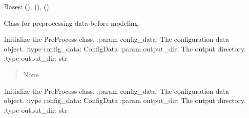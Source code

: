 \documentclass[a4paper,11pt,english,openany]{sphinxmanual}
\begin{document}
\begin{fulllineitems}
\label{\detokenize{api/spyice.preprocess.pre_process:src.spyice.preprocess.pre_process.PreProcess}}
\pysigstartsignatures
\pysigline
{}
\pysigstopsignatures
\sphinxAtStartPar
Bases: {\hyperref[\detokenize{api/spyice.parameters.user_input:src.spyice.parameters.user_input.UserInput}]{}} (), {\hyperref[\detokenize{api/spyice.preprocess.geometry_settings:src.spyice.preprocess.geometry_settings.GeometrySettings}]{}} (), {\hyperref[\detokenize{api/spyice.parameters.results_params:src.spyice.parameters.results_params.ResultsParams}]{}} ()

\sphinxAtStartPar
Class for preprocessing data before modeling.

\sphinxAtStartPar
Initialize the PreProcess class.
:param config\_data: The configuration data object.
:type config\_data: ConfigData
:param output\_dir: The output directory.
:type output\_dir: str
\begin{quote}\begin{description}
\sphinxAtStartPar
{} \textendash{} 

\sphinxAtStartPar
None

\end{description}\end{quote}

\begin{fulllineitems}
\label{\detokenize{api/spyice.preprocess.pre_process:src.spyice.preprocess.pre_process.PreProcess.__init__}}
\pysigstartsignatures
\pysiglinewithargsret
{}
{\sphinxparamcomma {}\sphinxparamcomma {}}
{}
\pysigstopsignatures
\sphinxAtStartPar
Initialize the PreProcess class.
:param config\_data: The configuration data object.
:type config\_data: ConfigData
:param output\_dir: The output directory.
:type output\_dir: str
\begin{quote}\begin{description}
\sphinxAtStartPar
{} \textendash{} 


\end{description}
\end{quote}
\end{fulllineitems}
\end{fulllineitems}
\end{document}
